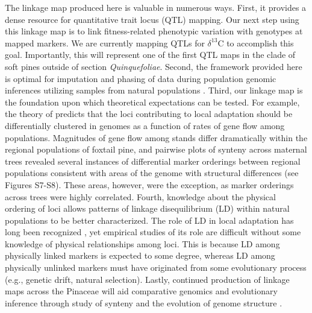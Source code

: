 \documentclass[smallextended]{svjour3}
\begin{document}
The linkage map produced here is valuable in numerous ways. First, it provides a
dense resource for quantitative trait locus (QTL) mapping. Our next step using
this linkage map is to link fitness-related phenotypic variation with genotypes
at mapped markers. We are currently mapping QTLs for $\delta^{13}$C to
accomplish this goal. Importantly, this will represent one of the first QTL maps
in the clade of soft pines outside of section \textit{Quinquefoliae}. Second,
the framework provided here is optimal for imputation and phasing of data during
population genomic inferences utilizing samples from natural populations
\citep{Scheet:2006}.  Third, our linkage map is the foundation upon which
theoretical expectations can be tested.  For example, the theory of
\citet{Yeaman:2011} predicts that the loci contributing to local adaptation
should be differentially clustered in genomes as a function of rates of gene
flow among populations. Magnitudes of gene flow among stands differ dramatically
within the regional populations of foxtail pine, and pairwise plots of synteny
across maternal trees revealed several instances of differential marker
orderings between regional populations consistent with areas of the genome with
structural differences (see Figures S7-S8). These areas, however, were the
exception, as marker orderings across trees were highly correlated.  Fourth,
knowledge about the physical ordering of loci allows patterns of linkage
disequilibrium (LD) within natural populations to be better characterized. The
role of LD in local adaptation has long been recognized
\citep[see][]{Akerman:2014}, yet empirical studies of its role are difficult
without some knowledge of physical relationships among loci. This is because LD
among physically linked markers is expected to some degree, whereas LD among
physically unlinked markers must have originated from some evolutionary process
(e.g., genetic drift, natural selection). Lastly, continued production of
linkage maps across the Pinaceae will aid comparative genomics and evolutionary
inference through study of synteny and the evolution of genome structure
\citep{Ritland:2011}.
\end{document}
